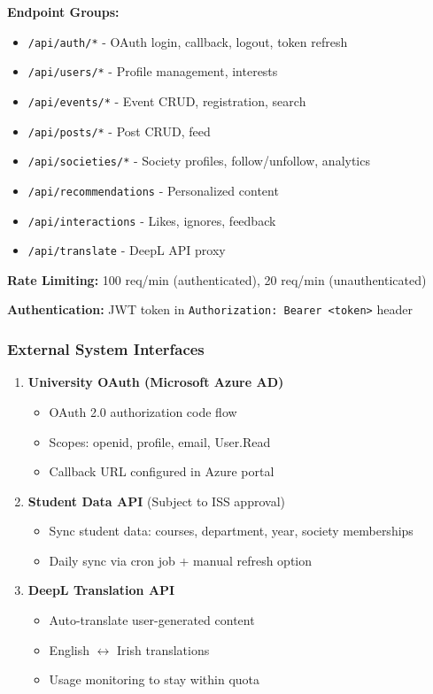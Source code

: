 \documentclass[12pt,a4paper]{article}
\begin{document}
\textbf{Endpoint Groups:}
\begin{itemize}
    \item \texttt{/api/auth/*} - OAuth login, callback, logout, token refresh
    \item \texttt{/api/users/*} - Profile management, interests
    \item \texttt{/api/events/*} - Event CRUD, registration, search
    \item \texttt{/api/posts/*} - Post CRUD, feed
    \item \texttt{/api/societies/*} - Society profiles, follow/unfollow, analytics
    \item \texttt{/api/recommendations} - Personalized content
    \item \texttt{/api/interactions} - Likes, ignores, feedback
    \item \texttt{/api/translate} - DeepL API proxy
\end{itemize}

\textbf{Rate Limiting:} 100 req/min (authenticated), 20 req/min (unauthenticated)

\textbf{Authentication:} JWT token in \texttt{Authorization: Bearer <token>} header

\subsubsection{External System Interfaces}

\begin{enumerate}
    \item \textbf{University OAuth (Microsoft Azure AD)}
    \begin{itemize}
        \item OAuth 2.0 authorization code flow
        \item Scopes: openid, profile, email, User.Read
        \item Callback URL configured in Azure portal
    \end{itemize}

    \item \textbf{Student Data API} (Subject to ISS approval)
    \begin{itemize}
        \item Sync student data: courses, department, year, society memberships
        \item Daily sync via cron job + manual refresh option
    \end{itemize}

    \item \textbf{DeepL Translation API}
    \begin{itemize}
        \item Auto-translate user-generated content
        \item English $\leftrightarrow$ Irish translations
        \item Usage monitoring to stay within quota
    \end{itemize}
\end{enumerate}
\end{document}
